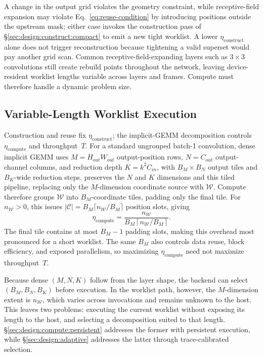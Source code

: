 A change in the output grid violates the geometry constraint, while
receptive-field expansion may violate Eq.~\ref{eq:reuse-condition} by
introducing positions outside the upstream mask; either case invokes the
construction pass of \S\ref{sec:design:construct:compact} to emit a new tight
worklist. A lower $\eta_{\mathrm{construct}}$ alone does not trigger
reconstruction because tightening a valid superset would pay another grid scan.
Common receptive-field-expanding layers such as $3\times3$ convolutions still
create rebuild points throughout the network, leaving device-resident worklist
lengths variable across layers and frames. Compute must therefore handle a
dynamic problem size.

\subsection{Variable-Length Worklist Execution}
\label{sec:design:compute}

Construction and reuse fix $\eta_{\mathrm{construct}}$; the implicit-GEMM
decomposition controls $\eta_{\mathrm{compute}}$ and throughput~$T$. For a
standard ungrouped batch-1 convolution, dense implicit GEMM uses
$M=H_{out}W_{out}$ output-position rows, $N=C_{out}$ output-channel columns, and
reduction depth $K=k^2C_{in}$, with $B_M\times B_N$ output tiles and
$B_K$-wide reduction steps.
\sysname preserves the $N$ and $K$ dimensions and this tiled pipeline, replacing
only the $M$-dimension coordinate source with $\mathcal{W}$.
Compute therefore groups $\mathcal{W}$ into $B_M$-coordinate tiles, padding
only the final tile. For $n_{\mathcal{W}}>0$, this issues
$|\mathcal{C}|=B_M\lceil n_{\mathcal{W}}/B_M\rceil$ position slots, giving
\begin{equation}
  \eta_{\mathrm{compute}}
  = \frac{n_{\mathcal{W}}}
         {B_M\left\lceil n_{\mathcal{W}}/B_M\right\rceil} .
  \label{eq:eta-compute}
\end{equation}
The final tile contains at most $B_M-1$ padding slots, making this overhead most
pronounced for a short worklist. The same $B_M$ also controls data reuse, block
efficiency, and exposed parallelism, so maximizing $\eta_{\mathrm{compute}}$
need not maximize throughput~$T$.

Because dense $(M,N,K)$ follow from the layer shape, the backend can select
$(B_M,B_N,B_K)$ before execution. In the worklist path, however, the
$M$-dimension extent is $n_{\mathcal{W}}$, which varies across invocations and
remains unknown to the host. This leaves two problems: executing the current
worklist without exposing its length to the host, and selecting a decomposition
suited to that length.
\S\ref{sec:design:compute:persistent} addresses the former with persistent
execution, while \S\ref{sec:design:adaptive} addresses the latter through
trace-calibrated selection.

